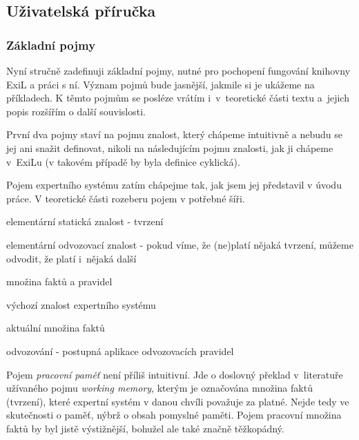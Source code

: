 \subsection{Uživatelská příručka}
\subsubsection{Základní pojmy}

Nyní stručně zadefinuji základní pojmy, nutné pro pochopení fungování knihovny
ExiL a práci s ní. Význam pojmů bude jasnější, jakmile si je ukážeme na
příkladech. K těmto pojmům se posléze vrátím i~v~teoretické části textu
a~jejich popis rozšířím o další souvislosti.

První dva pojmy staví na pojmu znalost, který chápeme intuitivně a nebudu se jej
ani snažit definovat, nikoli na následujícím pojmu znalosti, jak ji chápeme
v~ExiLu (v takovém případě by byla definice cyklická).

Pojem expertního systému zatím chápejme tak, jak jsem jej představil v úvodu
práce. V teoretické části rozeberu pojem v potřebné šíři.
\begin{description}[leftmargin=6cm,style=sameline,align=right,labelsep=0.5cm]
  \item[fakt] elementární statická znalost - tvrzení
  \item[(odvozovací) pravidlo] elementární odvozovací znalost - pokud víme, že
    (ne)platí nějaká tvrzení, můžeme odvodit, že platí i~nějaká další
  \item[znalost (v ExiLu)] množina faktů a pravidel
  \item[znalostní báze] výchozí znalost expertního systému
  \item[pracovní paměť] aktuální množina faktů
  \item[inference] odvozování - postupná aplikace odvozovacích pravidel
\end{description}
Pojem \emph{pracovní paměť} není příliš intuitivní. Jde o doslovný překlad
v~literatuře užívaného pojmu \emph{working memory}, kterým je označována množina
faktů (tvrzení), které expertní systém v danou chvíli považuje za platné. Nejde
tedy ve skutečnosti o paměť, nýbrž o obsah pomyslné paměti. Pojem pracovní
množina faktů by byl jistě výstižnější, bohužel ale také značně těžkopádný.

